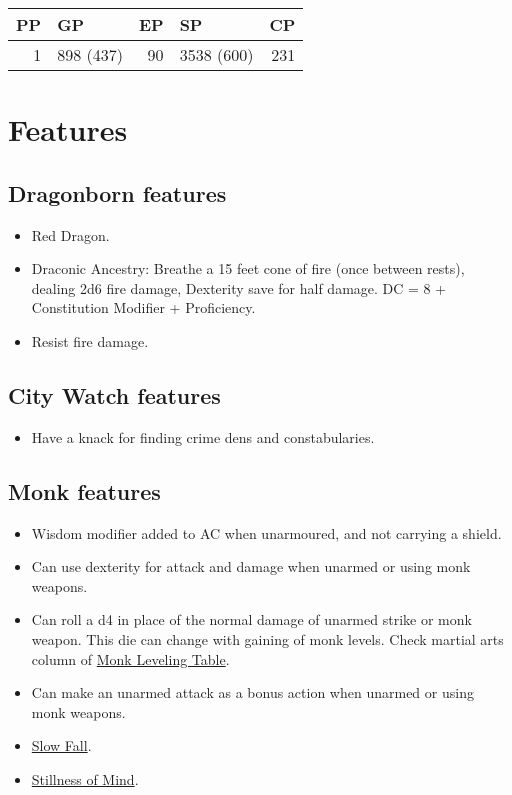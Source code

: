 \documentclass[11pt]{article}
\begin{document}
\begin{center}
\label{tab:org373da80}
\begin{tabular}{rlrlr}
PP & GP & EP & SP & CP\\
\hline
1 & 898 (437) & 90 & 3538 (600) & 231\\
\end{tabular}
\end{center}

\section{Features}
\label{sec:orgbddd58b}

\subsection{Dragonborn features}
\label{sec:org8bf4d9b}
\begin{itemize}
\item Red Dragon.
\item Draconic Ancestry: Breathe a 15 feet cone of fire (once between rests),
dealing 2d6 fire damage, Dexterity save for half damage. DC  = 8 +
Constitution Modifier + Proficiency.
\item Resist fire damage.
\end{itemize}

\subsection{City Watch features}
\label{sec:org71bb4b7}
\begin{itemize}
\item Have a knack for finding crime dens and constabularies.
\end{itemize}

\subsection{Monk features}
\label{sec:org5a13ce8}
\begin{itemize}
\item Wisdom modifier added to AC when unarmoured, and not carrying a shield.
\item Can use dexterity for attack and damage when unarmed or using monk
weapons.
\item Can roll a d4 in place of the normal damage of unarmed strike or monk
weapon. This die can change with gaining of monk levels. Check martial arts
column of \href{http://engl393-dnd5th.wikia.com/wiki/Monk}{Monk Leveling Table}.
\item Can make an unarmed attack as a bonus action when unarmed or using monk
weapons.
\item \href{http://engl393-dnd5th.wikia.com/wiki/Monk\#Slow\_Fall}{Slow Fall}.
\item \href{http://dnd5e.wikia.com/wiki/Monk\#Stillness\_of\_Mind}{Stillness of Mind}.
\end{itemize}
\end{document}
